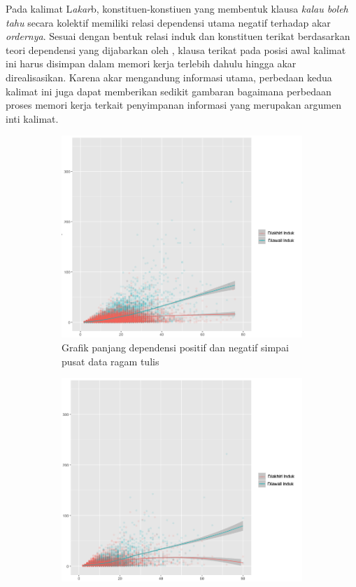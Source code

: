 Pada kalimat L\textit{akar}b, konstituen-konstiuen yang membentuk klausa \textit{kalau boleh tahu} secara kolektif memiliki relasi dependensi utama negatif terhadap akar \textit{ordernya}. Sesuai dengan bentuk relasi induk dan konstituen terikat berdasarkan teori dependensi yang dijabarkan oleh \cite{tesniere1959elements}, klausa terikat pada posisi awal kalimat ini harus disimpan dalam memori kerja terlebih dahulu hingga akar direalisasikan. Karena akar mengandung informasi utama, perbedaan kedua kalimat ini juga dapat memberikan sedikit gambaran bagaimana perbedaan proses memori kerja terkait penyimpanan informasi yang merupakan argumen inti kalimat.

\begin{figure}
\centering

\begin{subfigure}{.7\linewidth}
  \centering
  \includegraphics[width=1\linewidth] {pics/tulisroot_DLposneg.png} 
	\caption{Grafik panjang dependensi positif dan negatif simpai pusat data ragam tulis}
	\label{fig:tulisroot_DLposneg} 
\end{subfigure}
%
\begin{subfigure}{.7\linewidth}
  \centering
  \includegraphics[width=1\linewidth]{pics/lisanroot_DLposneg.png} 

\end{subfigure}
\end{figure}
